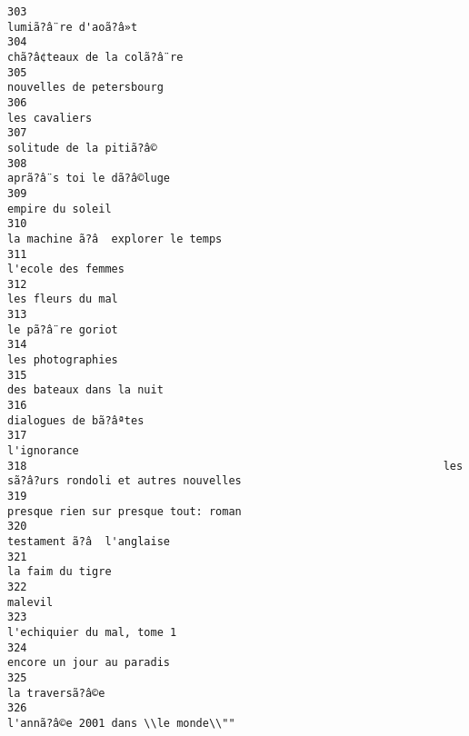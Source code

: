 \documentclass[
]{report}
\begin{document}
\begin{verbatim}
303                                                                                    lumiã?â¨re d'aoã?â»t
304                                                                             chã?â¢teaux de la colã?â¨re
305                                                                                nouvelles de petersbourg
306                                                                                           les cavaliers
307                                                                                 solitude de la pitiã?â©
308                                                                               aprã?â¨s toi le dã?â©luge
309                                                                                        empire du soleil
310                                                                       la machine ã?â  explorer le temps
311                                                                                      l'ecole des femmes
312                                                                                       les fleurs du mal
313                                                                                       le pã?â¨re goriot
314                                                                                       les photographies
315                                                                                des bateaux dans la nuit
316                                                                                   dialogues de bã?âªtes
317                                                                                             l'ignorance
318                                                                les sã?â?urs rondoli et autres nouvelles
319                                                                    presque rien sur presque tout: roman
320                                                                               testament ã?â  l'anglaise
321                                                                                        la faim du tigre
322                                                                                                 malevil
323                                                                              l'echiquier du mal, tome 1
324                                                                               encore un jour au paradis
325                                                                                         la traversã?â©e
326                                                                     l'annã?â©e 2001 dans \\le monde\\""

\end{verbatim}
\end{document}

